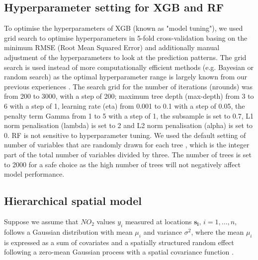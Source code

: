 \documentclass{article}
\begin{document}
\subsection{Hyperparameter setting for XGB and RF}
\label{sec:hp}

To optimise the hyperparameters of XGB (known as "model tuning"), we used grid search to optimise hyperparameters in 5-fold cross-validation basing on the minimum RMSE (Root Mean Squared Error) and additionally manual adjustment of the hyperparameters to look at the prediction patterns. The grid search is used instead of more computationally efficient methods (e.g. Bayesian or random search) as the optimal hyperparameter range is largely known from our previous experiences \citep{luglobal,nijmegen}. The search grid for the number of iterations (nrounds) was from 200 to 3000, with a step of 200; maximum tree depth (max-depth) from 3 to 6 with a step of 1, learning rate (eta) from 0.001 to 0.1 with a step of 0.05, the penalty term Gamma \citep{xgboost} from 1 to 5 with a step of 1, the subsample is set to 0.7, L1 norm penalisation (lambda) is set to 2 and L2 norm penalisation (alpha) is set to 0. %
RF is not sensitive to hyperparameter tuning. We used the default setting of number of variables that are randomly drawn for each tree \citep{breiman2001random}, which is the integer part of the total number of variables divided by three. The number of trees is set to 2000 for a safe choice as the high number of trees will not negatively affect model performance. 




\subsection{Hierarchical spatial model}

Suppose we assume that $NO_2$ values $y_i$ measured at locations $\boldsymbol{s_i}$, $i=1,\ldots,n$, follows a Gaussian distribution with mean $\mu_i$ and variance $\sigma^2$, where the mean $\mu_i$ is expressed as a sum of covariates and a spatially structured random effect following a zero-mean Gaussian process with a spatial covariance function \citep{moraga2019}.
\end{document}
